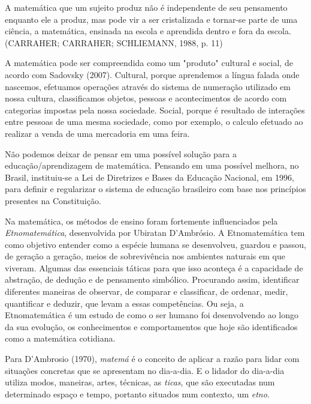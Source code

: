 \documentclass[brasil]{abnt}
\begin{document}
    \begin{citacao}A matemática que um sujeito produz não é independente de seu pensamento enquanto ele a produz, mas pode vir a ser cristalizada e tornar-se parte de uma 
			ciência, a matemática, ensinada na escola e aprendida dentro e fora da escola. (CARRAHER; CARRAHER; SCHLIEMANN, 1988, p. 11)
    \end{citacao}
    
    A matemática pode ser compreendida como um "produto" cultural e social, de acordo com Sadovsky (2007). Cultural, porque aprendemos a língua falada onde nascemos, efetuamos operações 
    através do sistema de numeração utilizado em nossa cultura, classificamos objetos, pessoas e acontecimentos de acordo com categorias impostas pela nossa 
    sociedade. Social, porque é resultado de interações entre pessoas de uma mesma sociedade, como por exemplo, o calculo efetuado ao realizar a venda de uma 
    mercadoria em uma feira.
    
    Não podemos deixar de pensar em uma possível solução para a educação/aprendizagem de matemática. Pensando em uma possível melhora, no Brasil, instituiu-se a 
    Lei de Diretrizes e Bases da Educação Nacional, em 1996, para definir e regularizar o sistema de educação brasileiro com base nos princípios presentes na Constituição. 
    
    Na matemática, os métodos de ensino foram fortemente influenciados pela \textit{Etnomatemática}, desenvolvida 
    por Ubiratan D’Ambrósio. A Etnomatemática tem como objetivo entender como a espécie humana se desenvolveu, guardou e passou, de geração a geração, meios de sobrevivência nos ambientes naturais em que viveram. 
	Algumas das essenciais táticas para que isso aconteça é a capacidade de abstração, de dedução e de pensamento simbólico. Procurando assim, identificar diferentes maneiras de observar,
	de comparar e classificar, de ordenar, medir, quantificar e deduzir, que levam a essas competências. Ou seja, a Etnomatemática é um estudo de como o ser humano foi desenvolvendo ao longo da sua
	evolução, os conhecimentos e comportamentos que hoje são identificados como a matemática cotidiana.
			
	Para D'Ambrosio (1970), \textit{matemá} é o conceito de aplicar a razão para lidar com situações concretas que se apresentam no dia-a-dia. E o lidador do dia-a-dia utiliza modos, maneiras, 
	artes, técnicas, as \textit{ticas}, que são executadas num determinado espaço e tempo, portanto situados num contexto, um \textit{etno}. 
			
\end{document}

